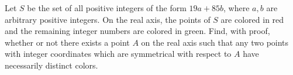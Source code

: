 Let $S$ be the set of all positive integers of the form $19a+85b$,  where $a,b$ are arbitrary positive integers. On the real axis, the points of $S$ are colored in red and the remaining integer numbers are colored in green. Find, with proof, whether or not there exists a point $A$ on the real axis such that any two points with integer coordinates which are symmetrical with respect to $A$ have necessarily distinct colors.